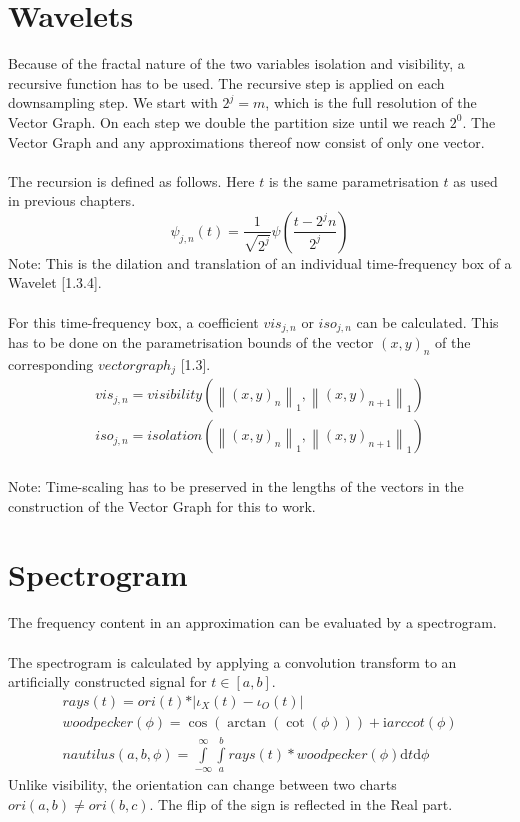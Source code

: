 \documentclass{report}
\newcommand\norm[1]{\left\lVert#1\right\rVert}
\begin{document}
\chapter{Wavelets}
Because of the fractal nature of the two variables isolation and visibility, a recursive function has to be used. The recursive step is applied on each downsampling step. We start with $2^j=m$, which is the full resolution of the Vector Graph. On each step we double the partition size until we reach $2^0$. The Vector Graph and any approximations thereof now consist of only one vector.\\\\
The recursion is defined as follows. Here $t$ is the same parametrisation $t$ as used in previous chapters.
\begin{equation}
\psi_{j,n}(t)=\frac{1}{\sqrt{2^j}}\psi(\frac{t-2^j n}{2^j})
\end{equation}
Note: This is the dilation and translation of an individual time-frequency box of a Wavelet \cite{Mallat}[1.3.4].\\\\
For this time-frequency box, a coefficient $vis_{j,n}$ or $iso_{j,n}$ can be calculated. This has to be done on the parametrisation bounds of the vector $(x,y)_n$ of the corresponding $vectorgraph_{j}$ \cite{Grapher}[1.3].
\begin{align}
vis_{j,n}=visibility(\norm{(x,y)_{n}}_{1},\norm{(x,y)_{n+1}}_{1})\\
iso_{j,n}=isolation(\norm{(x,y)_{n}}_{1},\norm{(x,y)_{n+1}}_{1})
\end{align}\\
Note: Time-scaling has to be preserved in the lengths of the vectors in the construction of the Vector Graph for this to work.

\chapter{Spectrogram}
The frequency content in an approximation can be evaluated by a spectrogram.\\\\
The spectrogram is calculated by applying a convolution transform to an artificially constructed signal for $t \in [a,b]$.
\begin{align}
rays(t)=ori(t)*\vert\iota_{X}(t)-\iota_{O}(t)\vert\\
woodpecker(\phi)=\cos(\arctan(\cot(\phi))) + \mathrm{i} arccot(\phi)\\
nautilus(a,b,\phi)=\int \limits _{-\infty}^{\infty}\int \limits _{a}^{b}rays(t)*woodpecker(\phi)\mathrm{d}t\mathrm{d}\phi
\end{align}
Unlike visibility, the orientation can change between two charts $ori(a,b)\neq ori(b,c)$. The flip of the sign is reflected in the Real part.
\end{document}

